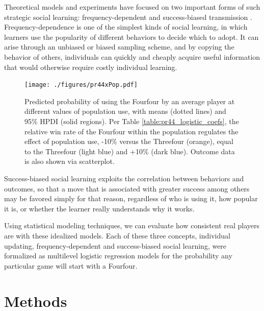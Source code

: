 \documentclass[reqno,12pt]{amsart}
\begin{document}
Theoretical models and experiments have focused on two important forms of such strategic social learning: frequency-dependent and success-biased transmission \citep{boyd1985culture, mcelreath2008successbias}. Frequency-dependence is one of the simplest kinds of social learning, in which learners use the popularity of different behaviors to decide which to adopt. It can arise through an unbiased or biased sampling scheme, and by copying the behavior of others, individuals can quickly and cheaply acquire useful information that would otherwise require costly individual learning.

\begin{figure}[t]
  \begin{center}
    \texttt{[image: ./figures/pr44xPop.pdf]}
    \caption{Predicted probability of using the Fourfour by an average player at different values of population use, with means (dotted lines) and 95\% HPDI (solid regions). Per Table \ref{table:pr44_logistic_coefs}, the relative win rate of the Fourfour within the population regulates the effect of population use, -10\% versus the Threefour (orange), equal to the Threefour (light blue) and +10\% (dark blue). Outcome data is also shown via scatterplot.}
    \label{fig:pr44}
  \end{center}
\end{figure}

Success-biased social learning exploits the correlation between behaviors and outcomes, so that a move that is associated with greater success among others may be favored simply for that reason, regardless of who is using it, how popular it is, or whether the learner really understands why it works.

Using statistical modeling techniques, we can evaluate how consistent real players are with these idealized models. Each of these three concepts, individual updating, frequency-dependent and success-biased social learning, were formalized as multilevel logistic regression models for the probability any particular game will start with a Fourfour.

\section{Methods}
\end{document}
